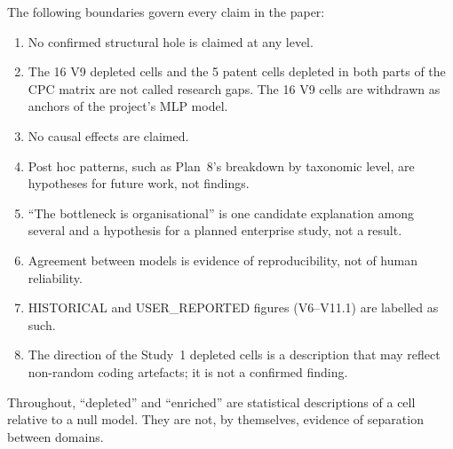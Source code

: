 The following boundaries govern every claim in the paper:
\begin{enumerate}
\item[(i)] No confirmed structural hole is claimed at any level.
\item[(ii)] The 16 V9 depleted cells and the 5 patent cells depleted in both parts of the CPC matrix are not called research gaps. The 16 V9 cells are withdrawn as anchors of the project's MLP model.
\item[(iii)] No causal effects are claimed.
\item[(iv)] Post hoc patterns, such as Plan~8's breakdown by taxonomic level, are hypotheses for future work, not findings.
\item[(v)] ``The bottleneck is organisational'' is one candidate explanation among several and a hypothesis for a planned enterprise study, not a result.
\item[(vi)] Agreement between models is evidence of reproducibility, not of human reliability.
\item[(vii)] HISTORICAL and USER\_REPORTED figures (V6--V11.1) are labelled as such.
\item[(viii)] The direction of the Study~1 depleted cells is a description that may reflect non-random coding artefacts; it is not a confirmed finding.
\end{enumerate}
Throughout, ``depleted'' and ``enriched'' are statistical descriptions of a cell relative to a null model. They are not, by themselves, evidence of separation between domains.
